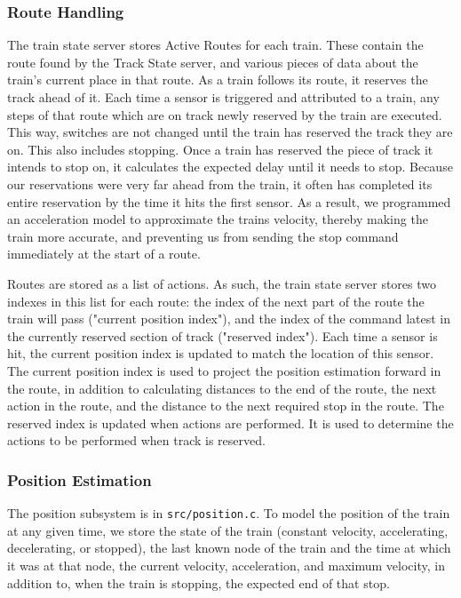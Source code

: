\documentclass{article}
\begin{document}
\subsubsection{Route Handling}
The train state server stores Active Routes for each train. These contain the route found by the Track State server, and various pieces of data about the train's current place in that route.
As a train follows its route, it reserves the track ahead of it.
Each time a sensor is triggered and attributed to a train, any steps of that route which are on track newly reserved by the train are executed. This way, switches are not changed until the train has reserved the track they are on. 
This also includes stopping. Once a train has reserved the piece of track it intends to stop on, it calculates the expected delay until it needs to stop.
Because our reservations were very far ahead from the train, it often has completed its entire reservation by the time it hits the first sensor. As a result, we programmed an acceleration model to approximate the trains velocity, thereby making the train more accurate, and preventing us from sending the stop command immediately at the start of a route.

Routes are stored as a list of actions.
As such, the train state server stores two indexes in this list for each route: the index of the next part of the route the train will pass ("current position index"), and the index of the command latest in the currently reserved section of track ("reserved index"). Each time a sensor is hit, the current position index is updated to match the location of this sensor.
The current position index is used to project the position estimation forward in the route, in addition to calculating distances to the end of the route, the next action in the route, and the distance to the next required stop in the route.
The reserved index is updated when actions are performed. It is used to determine the actions to be performed when track is reserved.

\subsubsection{Position Estimation}
The position subsystem is in \verb|src/position.c|.
To model the position of the train at any given time, we store the state of the train (constant velocity, accelerating, decelerating, or stopped), the last known node of the train and the time at which it was at that node, the current velocity, acceleration, and maximum velocity, in addition to, when the train is stopping, the expected end of that stop.
\end{document}
